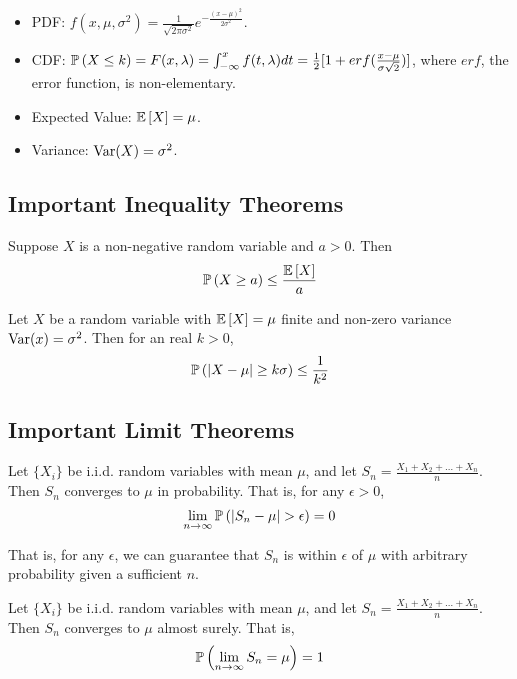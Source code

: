 \documentclass[12pt, titlepage]{article}
\begin{document}
\begin{info}{}
	\begin{itemize}
		\item PDF: $f(x, \mu, \sigma^2) = \frac{1}{\sqrt{2\pi \sigma^2}}e^{-\frac{(x - \mu)^2}{2 \sigma^2}}$.
		\item CDF: $\mathbb{P}\left(X \leq k\right) = F(x, \lambda) = \int_{-\infty}^x f(t, \lambda) dt = \frac{1}{2} [1 + erf(\frac{x - \mu}{\sigma \sqrt{2}})]$, where $erf$, the error function, is non-elementary.
		\item Expected Value: $\mathbb{E}\left[X\right] = \mu$.
		\item Variance: $\operatorname{Var}(X) = \sigma^2$.
	\end{itemize}
\end{info}

\subsection{Important Inequality Theorems}

\begin{theo}{}
Suppose $X$ is a non-negative random variable and $a > 0$. Then
\[\mathbb{P}\left(X \geq a\right) \leq \frac{\mathbb{E}\left[X\right]}{a}\]
\end{theo}

\begin{theo}{}
Let $X$ be a random variable with $\mathbb{E}\left[X\right] = \mu$ finite and non-zero variance $\operatorname{Var}(x) = \sigma^2$. Then for an real $k > 0$,
\[\mathbb{P}\left(|X - \mu| \geq k\sigma\right) \leq \frac{1}{k^2}\]
\end{theo}

\subsection{Important Limit Theorems}

\begin{theo}{}
Let $\{X_i\}$ be i.i.d. random variables with mean $\mu$, and let $S_n = \frac{X_1 + X_2 + \dots + X_n}{n}$. Then $S_n$ converges to $\mu$ in probability. That is, for any $\epsilon > 0$,
\[\lim_{n \to \infty} \mathbb{P}\left(|S_n - \mu| > \epsilon\right) = 0\]

That is, for any $\epsilon$, we can guarantee that $S_n$ is within $\epsilon$ of $\mu$ with arbitrary probability given a sufficient $n$.
\end{theo}

\begin{theo}{}
Let $\{X_i\}$ be i.i.d. random variables with mean $\mu$, and let $S_n = \frac{X_1 + X_2 + \dots + X_n}{n}$. Then $S_n$ converges to $\mu$ almost surely. That is, 
\[\mathbb{P}\left(\lim_{n \to \infty} S_n = \mu\right) = 1\]
\end{theo}
\end{document}
